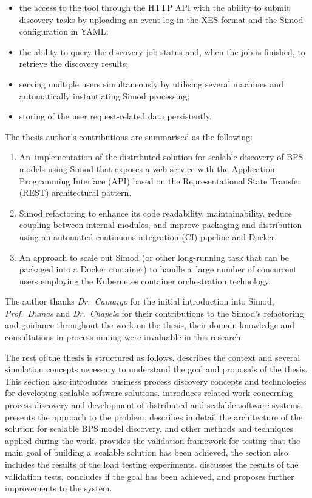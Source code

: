 \documentclass[12pt]{article}
\begin{document}
\begin{itemize}
    \item the access to the tool through the HTTP API with the ability to submit discovery tasks by uploading an event log in the XES format and the Simod configuration in YAML;
    \item the ability to query the discovery job status and, when the job is finished, to retrieve the discovery results;
    \item serving multiple users simultaneously by utilising several machines and automatically instantiating Simod processing;
    \item storing of the user request-related data persistently.
\end{itemize}

\noindent
The thesis author's contributions are summarised as the following: 
\begin{enumerate}%
    \item An~implementation of the distributed solution for scalable discovery of BPS models using Simod that exposes a web service with the Application Programming Interface (API) based on the Representational State Transfer (REST) architectural pattern.
    \item Simod refactoring to enhance its code readability, maintainability, reduce coupling between internal modules, and improve packaging and distribution using an automated continuous integration (CI) pipeline and Docker.
    \item An approach to scale out Simod (or other long-running task that can be packaged into a Docker container) to handle a~large number of concurrent users employing the Kubernetes container orchestration technology.
\end{enumerate}

\noindent
The author thanks \emph{Dr.~Camargo} for the initial introduction into Simod; \emph{Prof.~Dumas} and \emph{Dr.~Chapela} for their contributions to the Simod's refactoring and guidance throughout the work on the thesis, their domain knowledge and consultations in process mining were invaluable in this research.

The rest of the thesis is structured as follows.  describes the context and several simulation concepts necessary to understand the goal and proposals of the thesis. This section also introduces business process discovery concepts and technologies for developing scalable software solutions.  introduces related work concerning process discovery and development of distributed and scalable software systems.  presents the approach to the problem, describes in detail the architecture of the solution for scalable BPS model discovery, and other methods and techniques applied during the work.  provides the validation framework for testing that the main goal of building a~scalable solution has been achieved, the section also includes the results of the load testing experiments.  discusses the results of the validation tests, concludes if the goal has been achieved, and proposes further improvements to the system.
\end{document}
